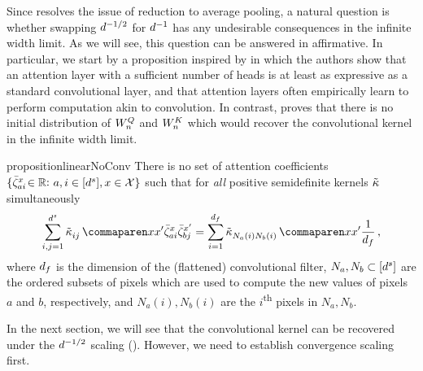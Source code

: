 \documentclass{article}
\begin{document}
Since  resolves the issue of reduction to average pooling, a natural question is whether  swapping $d^{-1/2}$ for $d^{-1}$ has any undesirable consequences in the infinite width limit.
As we will see, this question can be answered in affirmative.
In particular, we start by a proposition inspired by \citep{cordonnier2020On} in which the authors show that an attention layer with a sufficient number of heads is at least as expressive as a standard convolutional layer, 
and that attention layers often empirically learn to perform computation akin to convolution.
In contrast,  proves that there is no initial distribution of $W_{n}^{Q}$ and $W_{n}^{K}$ which would recover the convolutional kernel \citep{novak2019bayesian,garriga2019deep} in the infinite width limit.




\begin{restatable}{proposition}{linearNoConv}
\label{prop:linear_scale_no_conv}
    There is no set of attention coefficients $\{ \bar{\zeta}_{a i}^{x} \! \in \mathbb{R}^{} \! \colon a, i \in [d^s], x \in \mathcal{X} \}$ such that for \emph{all} positive semidefinite kernels $\tilde{\kappa}$ simultaneously
    \begin{align*}
        \sum_{i , j = 1}^{\spatialDimension} 
            \kerntildef{i j}{}{\inputSymbol}{\inputSymbol'}
                \softmaxMean_{a i}^\inputSymbol
                \softmaxMean_{b j}^{\inputSymbol'}
        =
        \sum_{i = 1}^{\genericDimenstion_f} 
            \kerntildef{N_a(i) N_b(i)}{}{\inputSymbol}{\inputSymbol'}
            \frac{1}{\genericDimenstion_f}
        \, ,
    \end{align*}
    where $d_f$ is the dimension of the (flattened) convolutional filter, $N_a, N_b \subset [d^s]$ are the ordered subsets of pixels which are used to compute the new values of pixels $a$ and $b$, respectively, and $N_a(i), N_b(i)$ are the $i$\textsuperscript{th} pixels in $N_a, N_b$.
\end{restatable}


In the next section, we will see that the convolutional kernel can be recovered under the $d^{-1/2}$ scaling (). 
However, we need to establish convergence scaling first.
\end{document}
